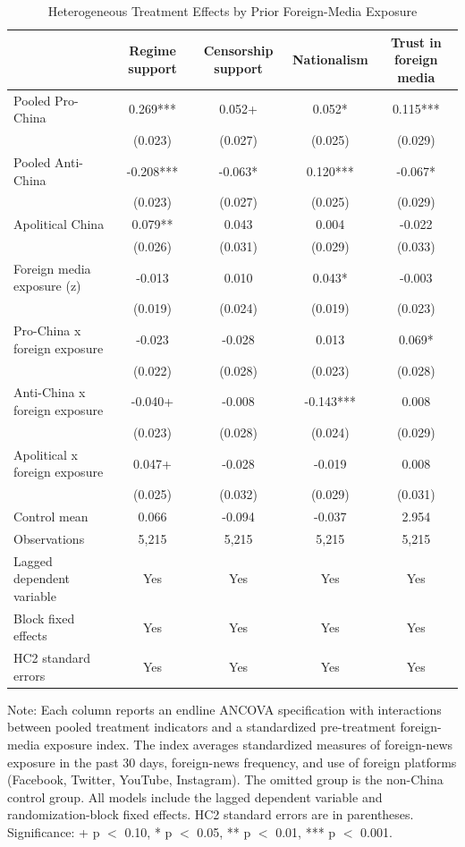 \begin{table}[H]
\centering
\caption{Heterogeneous Treatment Effects by Prior Foreign-Media Exposure}
\label{tab:het_foreign_t1}
\footnotesize
\begin{threeparttable}
\begin{tabular}{lcccc}
\toprule
 & Regime support & Censorship support & Nationalism & Trust in foreign media \\
\midrule
Pooled Pro-China & 0.269*** & 0.052+ & 0.052* & 0.115*** \\
 & (0.023) & (0.027) & (0.025) & (0.029) \\
\addlinespace
Pooled Anti-China & -0.208*** & -0.063* & 0.120*** & -0.067* \\
 & (0.023) & (0.027) & (0.025) & (0.029) \\
\addlinespace
Apolitical China & 0.079** & 0.043 & 0.004 & -0.022 \\
 & (0.026) & (0.031) & (0.029) & (0.033) \\
\addlinespace
Foreign media exposure (z) & -0.013 & 0.010 & 0.043* & -0.003 \\
 & (0.019) & (0.024) & (0.019) & (0.023) \\
\addlinespace
Pro-China x foreign exposure & -0.023 & -0.028 & 0.013 & 0.069* \\
 & (0.022) & (0.028) & (0.023) & (0.028) \\
\addlinespace
Anti-China x foreign exposure & -0.040+ & -0.008 & -0.143*** & 0.008 \\
 & (0.023) & (0.028) & (0.024) & (0.029) \\
\addlinespace
Apolitical x foreign exposure & 0.047+ & -0.028 & -0.019 & 0.008 \\
 & (0.025) & (0.032) & (0.029) & (0.031) \\
\addlinespace
\midrule
Control mean & 0.066 & -0.094 & -0.037 & 2.954 \\
Observations & 5,215 & 5,215 & 5,215 & 5,215 \\
Lagged dependent variable & Yes & Yes & Yes & Yes \\
Block fixed effects & Yes & Yes & Yes & Yes \\
HC2 standard errors & Yes & Yes & Yes & Yes \\
\bottomrule
\end{tabular}
\begin{tablenotes}[flushleft]
\footnotesize
\item Note: Each column reports an endline ANCOVA specification with interactions between pooled treatment indicators and a standardized pre-treatment foreign-media exposure index. The index averages standardized measures of foreign-news exposure in the past 30 days, foreign-news frequency, and use of foreign platforms (Facebook, Twitter, YouTube, Instagram). The omitted group is the non-China control group. All models include the lagged dependent variable and randomization-block fixed effects. HC2 standard errors are in parentheses. Significance: + p $<$ 0.10, * p $<$ 0.05, ** p $<$ 0.01, *** p $<$ 0.001.
\end{tablenotes}
\end{threeparttable}
\end{table}
